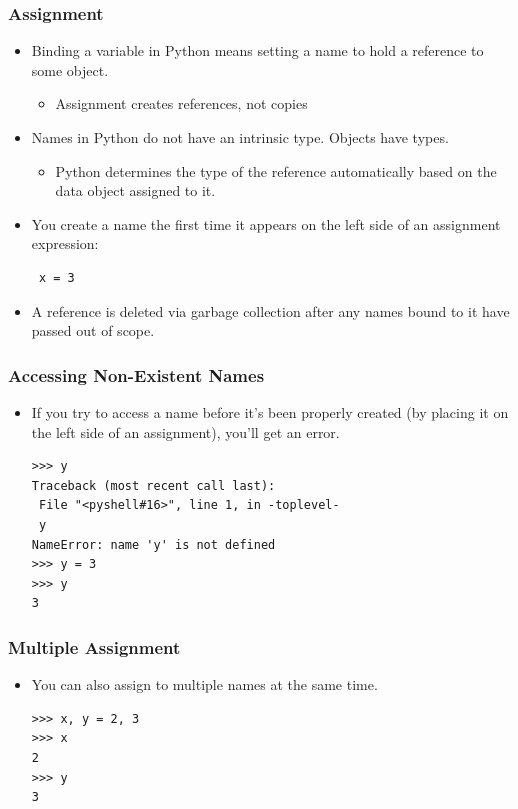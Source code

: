 \documentclass[12pt,handout]{beamer}
\begin{document}
\begin{frame}[fragile]
\frametitle{Assignment}

\begin{itemize}
\item Binding a variable in Python means setting a name to hold a
reference to some object.
\begin{itemize}
\item Assignment creates references, not copies
\end{itemize}
\item Names in Python do not have an intrinsic type. Objects have
types.
\begin{itemize}
\item Python determines the type of the reference automatically based on the
data object assigned to it.
\end{itemize}
\item You create a name the first time it appears on the left side of
an assignment expression:
\small{
\begin{verbatim}
 x = 3
\end{verbatim}
}
\item A reference is deleted via garbage collection after any names
bound to it have passed out of scope.
\end{itemize}
\end{frame}

\begin{frame}[fragile]
\frametitle{Accessing Non-Existent Names}
\begin{itemize}
\item If you try to access a name before it's been properly created
(by placing it on the left side of an assignment), you'll get an
error.
\small{
\begin{verbatim}
>>> y
Traceback (most recent call last):
 File "<pyshell#16>", line 1, in -toplevel-
 y
NameError: name 'y' is not defined
>>> y = 3
>>> y
3
\end{verbatim}
}
\end{itemize}
\end{frame}

\begin{frame}[fragile]
\frametitle{Multiple Assignment}

\begin{itemize}
\item You can also assign to multiple names at the same time.
\small{
\begin{verbatim}
>>> x, y = 2, 3
>>> x
2
>>> y
3
\end{verbatim}
}
\end{itemize}
\end{frame}
\end{document}
